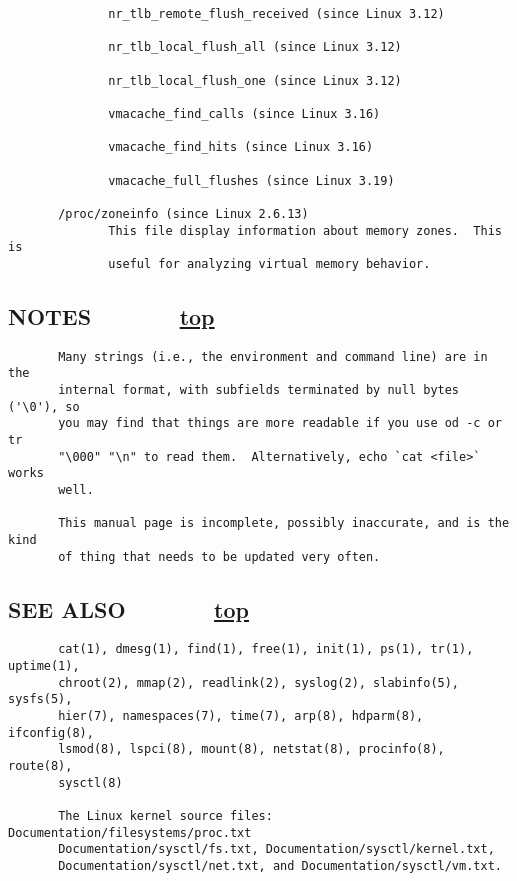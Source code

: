 \documentclass[]{article}
\begin{document}
\begin{verbatim}
              nr_tlb_remote_flush_received (since Linux 3.12)

              nr_tlb_local_flush_all (since Linux 3.12)

              nr_tlb_local_flush_one (since Linux 3.12)

              vmacache_find_calls (since Linux 3.16)

              vmacache_find_hits (since Linux 3.16)

              vmacache_full_flushes (since Linux 3.19)

       /proc/zoneinfo (since Linux 2.6.13)
              This file display information about memory zones.  This is
              useful for analyzing virtual memory behavior.
\end{verbatim}

\subsection{\texorpdfstring{\protect\hyperlink{NOTES}{}NOTES ~ ~ ~ ~
\protect\hyperlink{top_of_page}{{top}}}{NOTES ~ ~ ~ ~ top}}\label{notes-top}

\begin{verbatim}
       Many strings (i.e., the environment and command line) are in the
       internal format, with subfields terminated by null bytes ('\0'), so
       you may find that things are more readable if you use od -c or tr
       "\000" "\n" to read them.  Alternatively, echo `cat <file>` works
       well.

       This manual page is incomplete, possibly inaccurate, and is the kind
       of thing that needs to be updated very often.
\end{verbatim}

\subsection{\texorpdfstring{\protect\hyperlink{SEE_ALSO}{}SEE ALSO ~ ~ ~
~
\protect\hyperlink{top_of_page}{{top}}}{SEE ALSO ~ ~ ~ ~ top}}\label{see-also-top}

\begin{verbatim}
       cat(1), dmesg(1), find(1), free(1), init(1), ps(1), tr(1), uptime(1),
       chroot(2), mmap(2), readlink(2), syslog(2), slabinfo(5), sysfs(5),
       hier(7), namespaces(7), time(7), arp(8), hdparm(8), ifconfig(8),
       lsmod(8), lspci(8), mount(8), netstat(8), procinfo(8), route(8),
       sysctl(8)

       The Linux kernel source files: Documentation/filesystems/proc.txt
       Documentation/sysctl/fs.txt, Documentation/sysctl/kernel.txt,
       Documentation/sysctl/net.txt, and Documentation/sysctl/vm.txt.
\end{verbatim}
\end{document}
